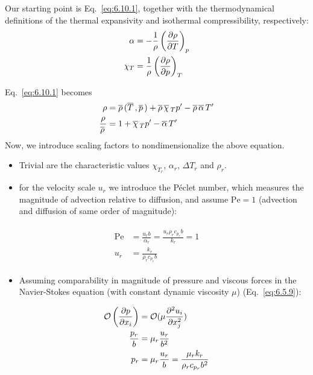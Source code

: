 \documentclass[document.tex]{subfiles}
\begin{document}
\begin{mdframed}
Our starting point is Eq.~\eqref{eq:6.10.1}, together with the thermodynamical definitions of the thermal expansivity and isothermal compressibility, respectively: 
\begin{align}
  \alpha &= -\frac{1}{\rho} \left(\pdv{\rho}{T}\right)_p \label{eq:6.8.2}\\
  \chi_T &= \frac{1}{\rho} \left(\pdv{\rho}{p}\right)_T \label{eq:6.8.3} 
\end{align}

Eq.~\eqref{eq:6.10.1} becomes
\begin{align} \label{eq:6.10.1b}
  \begin{split}
    \rho &= \overline{\rho}\,(\overline{T}\,, \overline{p}\,) + \overline{\rho}\,\overline{\chi}\,_T p' - \overline{\rho}\,\overline{\alpha}\,T' \\
  \frac{\rho}{\overline{\rho}\,} &= 1 + \overline{\chi}\,_T p' - \overline{\alpha}\,T'
  \end{split}
\end{align}
Now, we introduce scaling factors to nondimensionalize the above equation.
\begin{itemize}
\item Trivial are the characteristic values $\chi_{T_r}$,  $\alpha_r$, $\Delta T_r$ and $\rho_r$.
\item for the velocity scale $u_r$ we introduce the Péclet number, which measures the magnitude of advection relative to diffusion, and assume $\text{Pe} = 1$ (advection and diffusion of same order of magnitude): 
\end{itemize}
\begin{align}
  \begin{split}
  \text{Pe} &= \frac{u_r b}{\alpha_r} = \frac{u_r \rho_r c_{p_r} b}{k_r} = 1 \\
  u_r &= \frac{k_r}{\rho_rc_{p_r} b}
  \end{split}
\end{align}

\begin{itemize}
  \item Assuming comparability in magnitude of pressure and viscous forces in the Navier-Stokes equation (with constant dynamic viscosity $\mu$) (Eq.~\ref{eq:6.5.9}):
\end{itemize}
\begin{align}
  \begin{split}
  \mathcal{O}\left(\pdv{p}{x_i}\right) &= \mathcal{O}(\mu \pdv[2]{u_i}{x_j}) \\
  \frac{p_r}{b} &= \mu_r\frac{u_r}{b^2} \\
  p_r &= \mu_r\frac{u_r}{b} = \frac{\mu_r k_r}{\rho_r c_{p_r} b^2}
  \end{split}
\end{align}


\end{mdframed}
\end{document}
